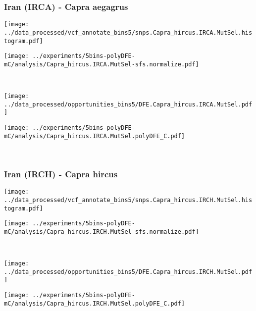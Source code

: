 \subsubsection{Iran (IRCA) - Capra aegagrus}

\begin{minipage}{0.49\linewidth}
    \texttt{[image: ../data\_processed/vcf\_annotate\_bins5/snps.Capra\_hircus.IRCA.MutSel.histogram.pdf]}
\end{minipage}
\begin{minipage}{0.49\linewidth}
    \texttt{[image: ../experiments/5bins-polyDFE-mC/analysis/Capra\_hircus.IRCA.MutSel-sfs.normalize.pdf]}
\end{minipage}
\\
\begin{minipage}{0.49\linewidth}
    \texttt{[image: ../data\_processed/opportunities\_bins5/DFE.Capra\_hircus.IRCA.MutSel.pdf]}
\end{minipage}
\begin{minipage}{0.49\linewidth}
    \texttt{[image: ../experiments/5bins-polyDFE-mC/analysis/Capra\_hircus.IRCA.MutSel.polyDFE\_C.pdf]}
\end{minipage}
\\

\subsubsection{Iran (IRCH) - Capra hircus}

\begin{minipage}{0.49\linewidth}
    \texttt{[image: ../data\_processed/vcf\_annotate\_bins5/snps.Capra\_hircus.IRCH.MutSel.histogram.pdf]}
\end{minipage}
\begin{minipage}{0.49\linewidth}
    \texttt{[image: ../experiments/5bins-polyDFE-mC/analysis/Capra\_hircus.IRCH.MutSel-sfs.normalize.pdf]}
\end{minipage}
\\
\begin{minipage}{0.49\linewidth}
    \texttt{[image: ../data\_processed/opportunities\_bins5/DFE.Capra\_hircus.IRCH.MutSel.pdf]}
\end{minipage}
\begin{minipage}{0.49\linewidth}
    \texttt{[image: ../experiments/5bins-polyDFE-mC/analysis/Capra\_hircus.IRCH.MutSel.polyDFE\_C.pdf]}
\end{minipage}
\\

